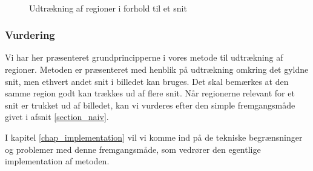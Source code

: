 {\begin{figure}[!p]
{        \label{sammen_floodfill}}\\
    \caption[]{Udtrækning af regioner i forhold til et snit}
    \label{sammensaetning}
\end{figure}

\subsubsection{Vurdering}
Vi har her præsenteret grundprincipperne i vores metode til udtrækning
af regioner. Metoden er præsenteret med henblik på udtrækning omkring
det gyldne snit, men ethvert andet snit i billedet kan bruges. Det skal
bemærkes at den samme region godt kan trækkes ud af flere snit. Når
regionerne relevant for et snit er trukket ud af billedet, kan vi
vurderes efter den simple fremgangsmåde givet i afsnit
\ref{section_naiv}.

I kapitel \ref{chap_implementation} vil vi komme ind på de tekniske
begrænsninger og problemer med denne fremgangsmåde, som vedrører den
egentlige implementation af metoden.

}

